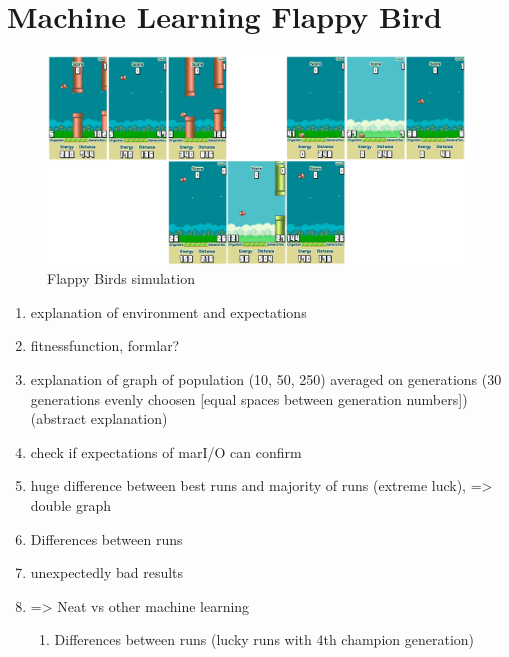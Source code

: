 	
	\section{Machine Learning Flappy Bird}
		\label{sec:analysis:flappy}
		
		\begin{figure}[h]
			\centering
			\includegraphics[width=1\textwidth]{graphics/flappy/flappy_sim_s1}
			\caption{Flappy Birds simulation}
		\end{figure}
		
		\begin{enumerate}
			\item explanation of environment and expectations
			\item fitnessfunction, formlar?
			\item explanation of graph of population (10, 50, 250) averaged on generations (30 generations evenly choosen [equal spaces between generation numbers])  (abstract explanation)
			\item check if expectations of marI/O can confirm
			\item huge difference between best runs and majority of runs (extreme luck), => double graph
			\item Differences between runs 
			\item unexpectedly bad results
			\item => Neat vs other machine learning
			\begin{enumerate}
				\item Differences between runs (lucky runs with 4th champion generation)
			\end{enumerate}
		\end{enumerate}
		
